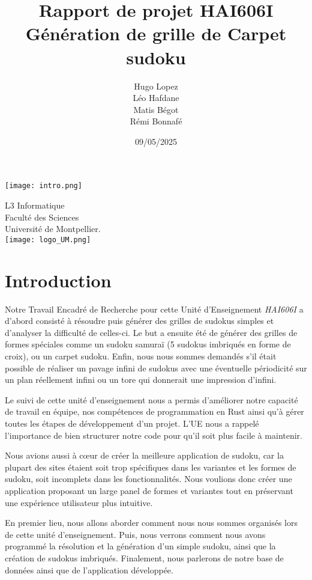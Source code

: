 \documentclass[a4paper]{article}
\title{Rapport de projet HAI606I \\
    Génération de grille de Carpet sudoku}
\date{09/05/2025}
\author{Hugo Lopez\\Léo Hafdane\\Matis Bégot\\Rémi Bonnafé}
\begin{document}
\maketitle

\texttt{[image: intro.png]}
\vspace{0.4cm}

\begin{center}
    L3 Informatique \\
    Faculté des Sciences \\
    Université de Montpellier. \\

    \texttt{[image: logo\_UM.png]}
\end{center}

\thispagestyle{empty}
\clearpage
{}
\newpage
{}
\setcounter{page}{1}

\tableofcontents
\newpage

\section{Introduction}
\label{sec:intro}

\begin{justify}
     \qquad Notre Travail Encadré de Recherche pour cette Unité d'Enseignement \textit{HAI606I} a d'abord consisté à résoudre puis générer des grilles de sudokus simples et d'analyser la difficulté de celles-ci. Le but a ensuite été de générer des grilles de formes spéciales comme un sudoku samuraï (5 sudokus imbriqués en forme de croix), ou un carpet sudoku. Enfin, nous nous sommes demandés s'il était possible de réaliser un pavage infini de sudokus avec une éventuelle périodicité sur un plan réellement infini ou un tore qui donnerait une impression d'infini. \bigskip
    
    Le suivi de cette unité d'enseignement nous a permis d'améliorer notre capacité de travail en équipe, nos compétences de programmation en Rust ainsi qu'à gérer toutes les étapes de développement d'un projet. L'UE nous a rappelé l'importance de bien structurer notre code pour qu'il soit plus facile à maintenir.
    \bigskip
    
    Nous avions aussi à cœur de créer la meilleure application de sudoku, car la plupart des sites étaient soit trop spécifiques dans les variantes et les formes de sudoku, soit incomplets dans les fonctionnalités. Nous voulions donc créer une application proposant un large panel de formes et variantes tout en préservant une expérience utilisateur plus intuitive.
    \bigskip

    En premier lieu, nous allons aborder comment nous nous sommes organisés lors de cette unité d'enseignement. Puis, nous verrons comment nous avons programmé la résolution et la génération d'un simple sudoku, ainsi que la création de sudokus imbriqués. Finalement, nous parlerons de notre base de données ainsi que de l'application développée. 
\end{justify}
\end{document}
